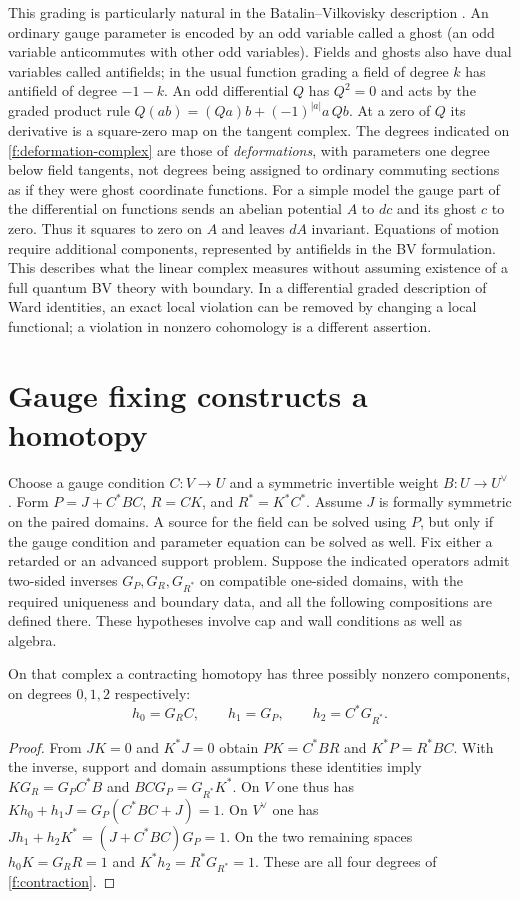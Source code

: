 This grading is particularly natural in the Batalin--Vilkovisky description \cite{CMR,Khavkine}. An ordinary gauge parameter is encoded by an odd variable called a ghost (an odd variable anticommutes with other odd variables). Fields and ghosts also have dual variables called antifields; in the usual function grading a field of degree $k$ has antifield of degree $-1-k$. An odd differential $Q$ has $Q^2=0$ and acts by the graded product rule $Q(ab)=(Qa)b+(-1)^{|a|}a\,Qb$. At a zero of $Q$ its derivative is a square-zero map on the tangent complex. The degrees indicated on \eqref{f:deformation-complex} are those of \emph{deformations}, with parameters one degree below field tangents, not degrees being assigned to ordinary commuting sections as if they were ghost coordinate functions. For a simple model the gauge part of the differential on functions sends an abelian potential $A$ to $dc$ and its ghost $c$ to zero. Thus it squares to zero on $A$ and leaves $dA$ invariant. Equations of motion require additional components, represented by antifields in the BV formulation. This describes what the linear complex measures without assuming existence of a full quantum BV theory with boundary. In a differential graded description of Ward identities, an exact local violation can be removed by changing a local functional; a violation in nonzero cohomology is a different assertion.

\section{Gauge fixing constructs a homotopy}
Choose a gauge condition $C:V\to U$ and a symmetric invertible weight $B:U\to U^\vee$. Form $P=J+C^*BC$, $R=CK$, and $R^*=K^*C^*$. Assume $J$ is formally symmetric on the paired domains. A source for the field can be solved using $P$, but only if the gauge condition and parameter equation can be solved as well. Fix either a retarded or an advanced support problem. Suppose the indicated operators admit two-sided inverses $G_P,G_R,G_{R^*}$ on compatible one-sided domains, with the required uniqueness and boundary data, and all the following compositions are defined there. These hypotheses involve cap and wall conditions as well as algebra.

\begin{proposition}\label{f:green-homotopy}
On that complex a contracting homotopy has three possibly nonzero components, on degrees $0,1,2$ respectively:
\[
 h_0=G_R C,\qquad h_1=G_P,\qquad h_2=C^*G_{R^*} .
\]
\end{proposition}
\begin{proof}
From $JK=0$ and $K^*J=0$ obtain $PK=C^*BR$ and $K^*P=R^*BC$. With the inverse, support and domain assumptions these identities imply $KG_R=G_PC^*B$ and $BCG_P=G_{R^*}K^*$. On $V$ one thus has $Kh_0+h_1J=G_P(C^*BC+J)=1$. On $V^\vee$ one has $Jh_1+h_2K^*=(J+C^*BC)G_P=1$. On the two remaining spaces $h_0K=G_RR=1$ and $K^*h_2=R^*G_{R^*}=1$. These are all four degrees of \eqref{f:contraction}.
\end{proof}


